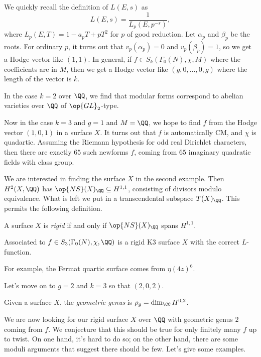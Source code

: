 \documentclass{article}
\begin{document}
We quickly recall the definition of $L(E,s)$ as
\[L(E,s)=\frac1{L_p\left(E,p^{-s}\right)},\]
where $L_p(E,T)=1-a_pT+pT^2$ for $p$ of good reduction. Let $\alpha_p$ and $\beta_p$ be the roots. For ordinary $p$, it turns out that $v_p(\alpha_p)=0$ and $v_p(\beta_p)=1$, so we get a Hodge vector like $(1,1)$. In general, if $f\in S_k(\Gamma_0(N),\chi,M)$ where the coefficients are in $M$, then we get a Hodge vector like $(g,0,\ldots,0,g)$ where the length of the vector is $k$.
\begin{example}
	In the case $k=2$ over $\QQ$, we find that modular forms correspond to abelian varieties over $\QQ$ of $\op{GL}_2$-type.
\end{example}
\begin{example}
	Now in the case $k=3$ and $g=1$ and $M=\QQ$, we hope to find $f$ from the Hodge vector $(1,0,1)$ in a surface $X$. It turns out that $f$ is automatically CM, and $\chi$ is quadartic. Assuming the Riemann hypothesis for odd real Dirichlet characters, then there are exactly $65$ such newforms $f$, coming from $65$ imaginary quadratic fields with class group.
\end{example}
We are interested in finding the surface $X$ in the second example. Then $H^2(X,\QQ)$ has $\op{NS}(X)_\QQ\subseteq H^{1,1}$, consisting of divisors modulo equivalence. What is left we put in a transcendental subspace $T(X)_\QQ$. This permits the following definition.
\begin{definition}[rigid]
	A surface $X$ is \textit{rigid} if and only if $\op{NS}(X)_\QQ$ spans $H^{1,1}$.
\end{definition}
\begin{theorem}
	Associated to $f\in S_3(\Gamma_0(N),\chi,\QQ)$ is a rigid K3 surface $X$ with the correct $L$-function.
\end{theorem}
\begin{example}
	For example, the Fermat quartic surface comes from $\eta(4z)^6$.
\end{example}
Let's move on to $g=2$ and $k=3$ so that $(2,0,2)$.
\begin{definition}
	Given a surface $X$, the \textit{geometric genus} is $\rho_g=\dim_\CC H^{0,2}$.
\end{definition}
We are now looking for our rigid surface $X$ over $\QQ$ with geometric genus $2$ coming from $f$. We conjecture that this should be true for only finitely many $f$ up to twist. On one hand, it's hard to do so; on the other hand, there are some moduli arguments that suggest there should be few. Let's give some examples.
\end{document}
